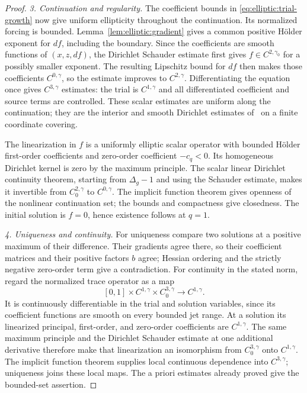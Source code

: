 \begin{proof}
\medskip\noindent\emph{3. Continuation and regularity.}
The coefficient bounds in \eqref{eq:elliptic:trial-growth} now give uniform ellipticity
throughout the continuation.  Its normalized forcing is bounded.
Lemma~\ref{lem:elliptic:gradient} gives a common positive H\"older
exponent for $df$, including the boundary.  Since the coefficients
are smooth functions of $(x,z,df)$, the Dirichlet Schauder estimate
first gives $f\in C^{2,\gamma_0}$ for a possibly smaller exponent.
The resulting Lipschitz bound for $df$ then makes those coefficients
$C^{0,\gamma}$, so the estimate improves to $C^{2,\gamma}$.
Differentiating the equation once gives $C^{3,\gamma}$ estimates:
the trial is $C^{1,\gamma}$ and all differentiated coefficient and
source terms are controlled.  These scalar estimates are uniform
along the continuation; they are the interior and smooth Dirichlet
estimates of~\cite{GilbargTrudinger} on a finite coordinate covering.

The linearization in $f$ is a uniformly elliptic scalar operator with
bounded H\"older first-order coefficients and zero-order coefficient
$-c_q<0$.  Its homogeneous Dirichlet kernel is zero by the maximum
principle.  The scalar linear Dirichlet continuity theorem, starting
from $\Delta_g-1$ and using the Schauder estimate, makes it invertible
from $C^{2,\gamma}_0$ to $C^{0,\gamma}$.
The implicit function theorem gives openness of the nonlinear
continuation set; the bounds and compactness give closedness.
The initial solution is $f=0$, hence existence follows at $q=1$.

\medskip\noindent\emph{4. Uniqueness and continuity.}
For uniqueness compare two solutions at a positive maximum of their
difference.  Their gradients agree there, so their coefficient
matrices and their positive factors $b$ agree; Hessian ordering and
the strictly negative zero-order term give a contradiction.
For continuity in the stated norm, regard the normalized trace
operator as a map
\[
 [0,1]\times C^{1,\gamma}\times C^{3,\gamma}_0
                    \longrightarrow C^{1,\gamma}.
\]
It is continuously differentiable in the trial and solution variables,
since its coefficient functions are smooth on every bounded jet range.
At a solution its linearized principal, first-order, and zero-order
coefficients are $C^{1,\gamma}$.  The same maximum principle and
the Dirichlet Schauder estimate at one additional derivative therefore make
that linearization an isomorphism from $C^{3,\gamma}_0$ onto
$C^{1,\gamma}$.  The implicit function theorem supplies local
continuous dependence into $C^{3,\gamma}$; uniqueness joins these
local maps.  The a priori estimates already proved give the
bounded-set assertion.
\end{proof}


